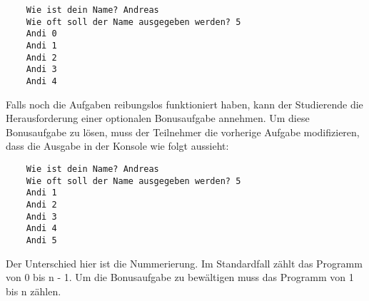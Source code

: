 \begin{lstlisting}
    Wie ist dein Name? Andreas
    Wie oft soll der Name ausgegeben werden? 5
    Andi 0
    Andi 1
    Andi 2
    Andi 3
    Andi 4
\end{lstlisting}

Falls noch die Aufgaben reibungslos funktioniert haben, kann der Studierende
die Herausforderung einer optionalen Bonusaufgabe annehmen. Um diese
Bonusaufgabe zu lösen, muss der Teilnehmer die vorherige Aufgabe modifizieren,
dass die Ausgabe in der Konsole wie folgt aussieht:

\begin{lstlisting}
    Wie ist dein Name? Andreas
    Wie oft soll der Name ausgegeben werden? 5
    Andi 1
    Andi 2
    Andi 3
    Andi 4
    Andi 5
\end{lstlisting}

Der Unterschied hier ist die Nummerierung. Im Standardfall zählt das Programm
von 0 bis n - 1. Um die Bonusaufgabe zu bewältigen muss das Programm von 1 bis n
zählen.